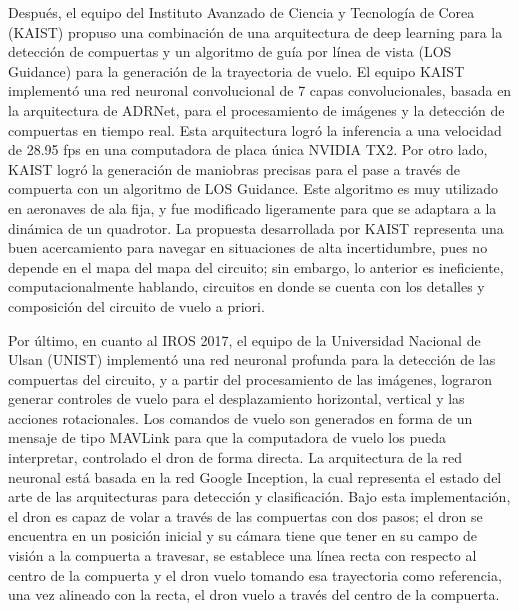 Después, el equipo del Instituto Avanzado de Ciencia y Tecnología de Corea (KAIST) propuso una combinación de una arquitectura de deep learning para la detección de compuertas y un algoritmo de guía por línea de vista (LOS Guidance) para la generación de la trayectoria de vuelo.
 El equipo KAIST implementó una red neuronal convolucional de 7 capas convolucionales, basada en la arquitectura de ADRNet, para el procesamiento de imágenes y la detección de compuertas en tiempo real. Esta arquitectura logró la inferencia a una velocidad de 28.95 fps en una computadora de placa única NVIDIA TX2. 
Por otro lado, KAIST logró la generación de maniobras precisas para el pase a través de compuerta con un algoritmo de LOS Guidance. Este algoritmo es muy utilizado en aeronaves de ala fija, y fue modificado ligeramente para que se adaptara a la dinámica de un quadrotor.
La propuesta desarrollada por KAIST representa una buen acercamiento para navegar en situaciones de alta incertidumbre, pues no depende en el mapa del mapa del circuito; sin embargo, lo anterior es ineficiente, computacionalmente hablando, circuitos en donde se cuenta con los detalles y composición del circuito de vuelo a priori.

Por último, en cuanto al IROS 2017, el equipo de la Universidad Nacional de Ulsan (UNIST) implementó una red neuronal profunda para la detección de las compuertas del circuito, y a partir del procesamiento de las imágenes, lograron generar controles de vuelo para el desplazamiento horizontal, vertical y las acciones rotacionales. Los comandos de vuelo son generados en forma de un mensaje de tipo MAVLink para que la computadora de vuelo los pueda interpretar, controlado el dron de forma directa.
La arquitectura de la red neuronal está basada en la red Google Inception, la cual representa el estado del arte de las arquitecturas para detección y clasificación. 
Bajo esta implementación, el dron es capaz de volar a través de las compuertas con dos pasos; el dron se encuentra en un posición inicial y su cámara tiene que tener en su campo de visión a la compuerta a travesar, se establece una línea recta con respecto al centro de la compuerta y el dron vuelo tomando esa trayectoria como referencia, una vez alineado con la recta, el dron vuelo a través del centro de la compuerta.


